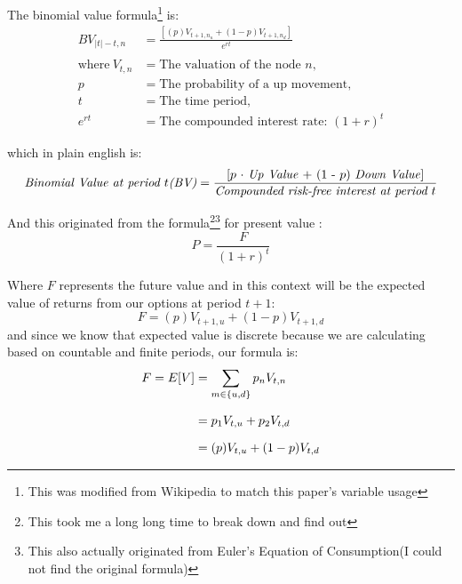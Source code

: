 \documentclass[12pt, letterpaper]{article}\usepackage{float}
\begin{document}
\bigskip

The binomial value formula\footnote{This was modified from Wikipedia to match this paper's variable usage} is:
\begin{align*}
  BV_{\vert t \vert - t, n} &= \frac{[(p)V_{t+1,n_u} + (1-p)V_{t+1,n_d}]}{e^{rt}} \\
  \\
  \text{where}~V_{t,n} &= \text{The valuation of the node ${n}$}, \\
  p &= \text{The probability of a up movement}, \\
  t &= \text{The time period}, \\
  e^{rt} &= \text{The compounded interest rate: } (1 + r)^t
\end{align*}

\pagebreak

\noindent which in plain english is:
\begin{equation*}
  \text{\textit{Binomial Value at period ${t}$(BV)}} = \frac{\text{[${p}$ ${\cdot}$ \textit{Up Value} + (1 - ${p}$) \textit{Down Value}]}}{\text{\textit{Compounded risk-free interest at period ${t}$}}}
\end{equation*}

\bigskip

And this originated from the formula\footnote{This took me a long long time to break down and find out}\footnote{This also actually originated from Euler's Equation of Consumption\cite{riskneutralmeasurestackexchange}(I could not find the original formula) } for present value \cite{presentvaluewikipedia}:
\begin{equation*}
  P = \frac{F}{(1+r)^t}
\end{equation*}

\noindent Where ${F}$ represents the future value and in this context will be the expected value of returns from our options at period ${t+1}$:
\begin{equation*}
  F = (p)V_{t+1,u} + (1-p)V_{t+1,d}
\end{equation*}
and since we know that expected value is discrete because we are calculating based on countable and finite periods, our formula\cite{hussainteaching} is:
\begin{equation*}
  \setlength{\jot}{10pt}
  \begin{split}
    F = E[V] 
    & = \sum\limits_{m \in \{u,d\}} p_n V_{t,n} \\
    & = p_1 V_{t,u} + p_2 V_{t,d} \\
    & = (p) V_{t,u} + (1-p) V_{t,d} \\
  \end{split}
\end{equation*}
\end{document}
